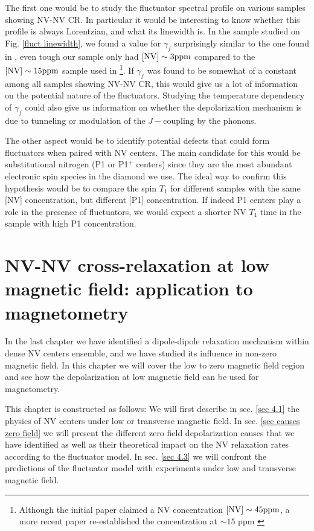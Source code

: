 \documentclass[a4paper, 11pt]{report}
\begin{document}
The first one would be to study the fluctuator spectral profile on various samples showing NV-NV CR. In particular it would be interesting to know whether this profile is always Lorentzian, and what its linewidth is. In the sample studied on Fig. \ref{fluct linewidth}, we found a value for $\gamma_f$ surprisingly similar to the one found in \citep{choi2017depolarization}, even tough our sample only had $[\rm NV] \sim 3 ppm$ compared to the $[\rm NV] \sim 15 ppm$ sample used in \citep{choi2017depolarization} \footnote{Although the initial paper claimed a NV concentration $[\rm NV] \sim 45 ppm$, a more recent paper re-established the concentration at $\sim 15$ ppm \citep{zhou2020quantum}}. If $\gamma_f$ was found to be somewhat of a constant among all samples showing NV-NV CR, this would give us a lot of information on the potential nature of the fluctuators. Studying the temperature dependency of $\gamma_f$ could also give us information on whether the depolarization mechanism is due to tunneling or modulation of the $J-$coupling by the phonons.

The other aspect would be to identify potential defects that could form fluctuators when paired with NV centers. The main candidate for this would be substitutional nitrogen (P1 or P1$^+$ centers) since they are the most abundant electronic spin species in the diamond we use. The ideal way to confirm this hypothesis would be to compare the spin $T_1$ for  different samples with the same [NV] concentration, but different [P1] concentration. If indeed P1 centers play a role in the presence of fluctuators, we would expect a shorter NV $T_1$ time in the sample with high P1 concentration.



\chapter{NV-NV cross-relaxation at low magnetic field: application to magnetometry}

In the last chapter we have identified a dipole-dipole relaxation mechanism within dense NV centers ensemble, and we have studied its influence in non-zero magnetic field. In this chapter we will cover the low to zero magnetic field region and see how the depolarization at low magnetic field can be used for magnetometry.

This chapter is constructed as follows: We will first describe in sec. \ref{sec 4.1} the physics of NV centers under low or transverse magnetic field. In sec. \ref{sec causes zero field}
we will present the different zero field depolarization causes that we have identified as well as their theoretical impact on the NV relaxation rates according to the fluctuator model. In sec. \ref{sec 4.3} we will confront the predictions of the fluctuator model with experiments under low and transverse magnetic field. 
\end{document}
